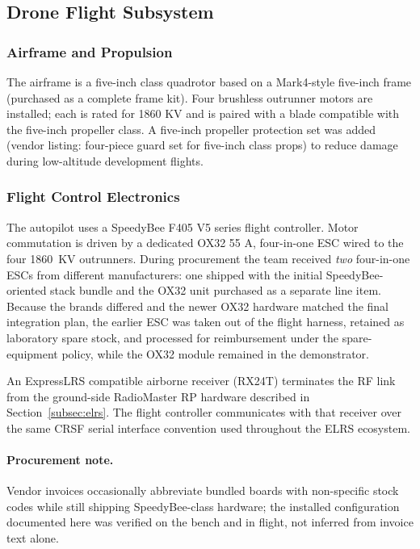 \subsection{Drone Flight Subsystem}
\label{subsec:drone}

\subsubsection{Airframe and Propulsion}

The airframe is a five-inch class quadrotor based on a Mark4-style five-inch frame
(purchased as a complete frame kit).
Four brushless outrunner motors are installed; each is rated for 1860 KV and is paired with a
blade compatible with the five-inch propeller class.
A five-inch propeller protection set was added (vendor listing: four-piece guard set for five-inch
class props) to reduce damage during low-altitude development flights.

\subsubsection{Flight Control Electronics}

The autopilot uses a SpeedyBee F405 V5 series flight controller.
Motor commutation is driven by a dedicated OX32 55 A, four-in-one ESC wired to the four
1860~KV outrunners.
During procurement the team received \emph{two} four-in-one ESCs from different manufacturers:
one shipped with the initial SpeedyBee-oriented stack bundle and the OX32 unit purchased as a
separate line item.
Because the brands differed and the newer OX32 hardware matched the final integration plan, the
earlier ESC was taken out of the flight harness, retained as laboratory spare stock, and processed for
reimbursement under the spare-equipment policy, while the OX32 module remained in the
demonstrator.

An ExpressLRS compatible airborne receiver (RX24T) terminates the RF link from the ground-side
RadioMaster RP hardware described in Section~\ref{subsec:elrs}.
The flight controller communicates with that receiver over the same CRSF serial interface
convention used throughout the ELRS ecosystem.

\paragraph{Procurement note.}
Vendor invoices occasionally abbreviate bundled boards with non-specific stock codes while still
shipping SpeedyBee-class hardware; the installed configuration documented here was verified on
the bench and in flight, not inferred from invoice text alone.

